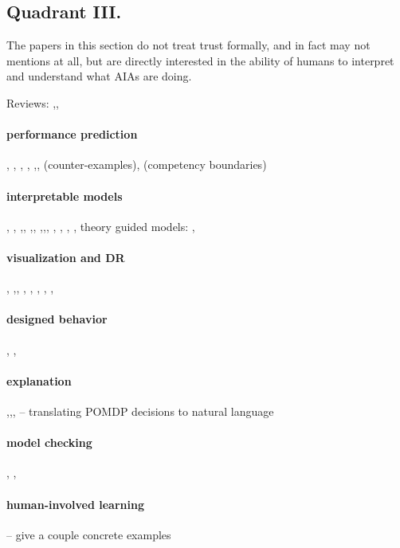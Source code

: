 \subsection{Quadrant III.}
The papers in this section do not treat trust formally, and in fact may not mentions at all, but are directly interested in the ability of humans to interpret and understand what AIAs are doing.

Reviews: \cite{Lacave2002-cu},\cite{Van_Belle2012-dt},

\paragraph{performance prediction}
\cite{Zhang2014-he}, \cite{Gurau2016-hs}, \cite{Kaipa2015-hy}, \cite{Churchill2015-ei}, \cite{Amodei2016-xi},\cite{Zhang2014-he},\cite{Kuter2015-qh} (counter-examples), \cite{Hutchins2015-if} (competency boundaries)

\paragraph{interpretable models}
\cite{Van_Belle2012-dt}, \cite{Jovanovic2016-gw}, \cite{Ruping2006-xj},\cite{Otte2013-oo}, \cite{Caruana2015-za},\cite{Ridgeway1998-lv}, \cite{Otte2013-oo},\cite{Kadous1999-rx},\cite{Choi2016-by}, \cite{Huysmans2011-th}, \cite{Van_Belle2013-ph}, \cite{Huang2016-vd}, \cite{Park2016-ld}, theory guided models: \cite{Zycinski2012-jj}, \cite{Kumar2016-yw}

\paragraph{visualization and DR}
\cite{Venna2007-yj}, \cite{Turner2016-jq},\cite{Van_Belle2013-ph}, \cite{Hutchins2015-if}, \cite{Lipton2016-ug}, \cite{Ribeiro2016-uc}, \cite{Montavon2015-mv}, \cite{Abdollahi2016-vn}, \cite{Vellido2012-nm}

\paragraph{designed behavior}
\cite{Dwork2012-fq}, \cite{Amodei2016-xi},

\paragraph{explanation}
\cite{Swartout1983-ko},\cite{Rouse1986-dz},\cite{Wallace2001-fm}, \cite{Lomas2012-ie} -- translating POMDP decisions to natural language

\paragraph{model checking}
\cite{Laskey1991-mf}, \cite{Zagorecki2015-qy}, \cite{Ghosh2016-dl}

\paragraph{human-involved learning}
\cite{Freitas2006-qo} -- give a couple concrete examples
